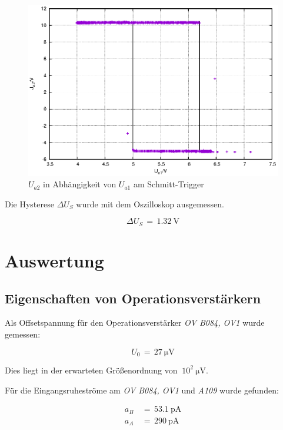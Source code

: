 \documentclass[10pt,a4paper]{scrartcl}
\begin{document}
\begin{figure}[!ht]
    \includegraphics[width=\textwidth]{graphics/schmitt.eps}
    \caption{$U_{a2}$ in Abhängigkeit von $U_{a1}$ am Schmitt-Trigger}
    \label{fig:schmitt}
\end{figure}

Die Hysterese $\Delta U_S$ wurde mit dem Oszilloskop ausgemessen.

\begin{equation}
    \Delta U_S\,=\,1.32~\mathrm V
\end{equation}

\pagebreak
\section {Auswertung}

\subsection {Eigenschaften von Operationsverstärkern}

Als Offsetspannung für den Operationsverstärker \emph{OV B084, OV1}
wurde gemessen:

\begin{equation*}
    U_0\,=\,27~\mathrm{\mu V}
\end{equation*}

Dies liegt in der erwarteten Größenordnung von $~10^2~\mathrm{\mu V}$.

Für die Eingangsruheströme am \emph{OV B084, OV1} und \emph{A109}
wurde gefunden:

\begin{align*}
    a_B\,&=\,53.1~\mathrm{pA}\\
    a_A\,&=\,290~\mathrm{pA}
\end{align*}
\end{document}
